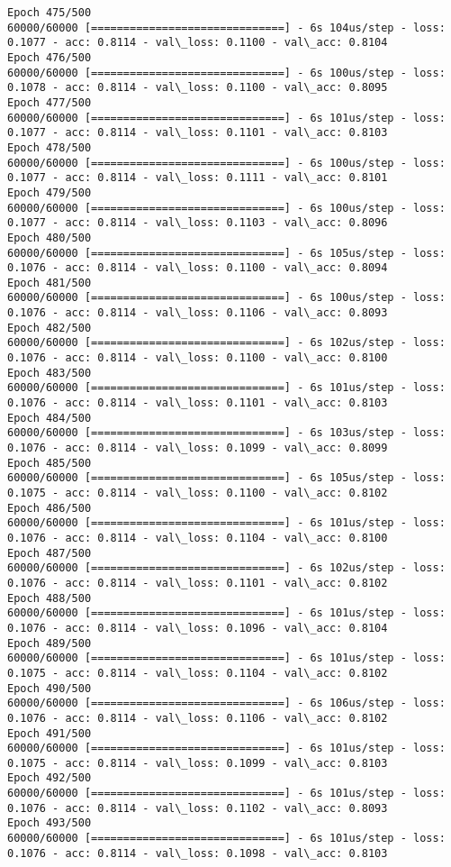 \documentclass[11pt]{article}
\begin{document}
\begin{Verbatim}[commandchars=\\\{\}]
Epoch 475/500
60000/60000 [==============================] - 6s 104us/step - loss: 0.1077 - acc: 0.8114 - val\_loss: 0.1100 - val\_acc: 0.8104
Epoch 476/500
60000/60000 [==============================] - 6s 100us/step - loss: 0.1078 - acc: 0.8114 - val\_loss: 0.1100 - val\_acc: 0.8095
Epoch 477/500
60000/60000 [==============================] - 6s 101us/step - loss: 0.1077 - acc: 0.8114 - val\_loss: 0.1101 - val\_acc: 0.8103
Epoch 478/500
60000/60000 [==============================] - 6s 100us/step - loss: 0.1077 - acc: 0.8114 - val\_loss: 0.1111 - val\_acc: 0.8101
Epoch 479/500
60000/60000 [==============================] - 6s 100us/step - loss: 0.1077 - acc: 0.8114 - val\_loss: 0.1103 - val\_acc: 0.8096
Epoch 480/500
60000/60000 [==============================] - 6s 105us/step - loss: 0.1076 - acc: 0.8114 - val\_loss: 0.1100 - val\_acc: 0.8094
Epoch 481/500
60000/60000 [==============================] - 6s 100us/step - loss: 0.1076 - acc: 0.8114 - val\_loss: 0.1106 - val\_acc: 0.8093
Epoch 482/500
60000/60000 [==============================] - 6s 102us/step - loss: 0.1076 - acc: 0.8114 - val\_loss: 0.1100 - val\_acc: 0.8100
Epoch 483/500
60000/60000 [==============================] - 6s 101us/step - loss: 0.1076 - acc: 0.8114 - val\_loss: 0.1101 - val\_acc: 0.8103
Epoch 484/500
60000/60000 [==============================] - 6s 103us/step - loss: 0.1076 - acc: 0.8114 - val\_loss: 0.1099 - val\_acc: 0.8099
Epoch 485/500
60000/60000 [==============================] - 6s 105us/step - loss: 0.1075 - acc: 0.8114 - val\_loss: 0.1100 - val\_acc: 0.8102
Epoch 486/500
60000/60000 [==============================] - 6s 101us/step - loss: 0.1076 - acc: 0.8114 - val\_loss: 0.1104 - val\_acc: 0.8100
Epoch 487/500
60000/60000 [==============================] - 6s 102us/step - loss: 0.1076 - acc: 0.8114 - val\_loss: 0.1101 - val\_acc: 0.8102
Epoch 488/500
60000/60000 [==============================] - 6s 101us/step - loss: 0.1076 - acc: 0.8114 - val\_loss: 0.1096 - val\_acc: 0.8104
Epoch 489/500
60000/60000 [==============================] - 6s 101us/step - loss: 0.1075 - acc: 0.8114 - val\_loss: 0.1104 - val\_acc: 0.8102
Epoch 490/500
60000/60000 [==============================] - 6s 106us/step - loss: 0.1076 - acc: 0.8114 - val\_loss: 0.1106 - val\_acc: 0.8102
Epoch 491/500
60000/60000 [==============================] - 6s 101us/step - loss: 0.1075 - acc: 0.8114 - val\_loss: 0.1099 - val\_acc: 0.8103
Epoch 492/500
60000/60000 [==============================] - 6s 101us/step - loss: 0.1076 - acc: 0.8114 - val\_loss: 0.1102 - val\_acc: 0.8093
Epoch 493/500
60000/60000 [==============================] - 6s 101us/step - loss: 0.1076 - acc: 0.8114 - val\_loss: 0.1098 - val\_acc: 0.8103

\end{Verbatim}
\end{document}
